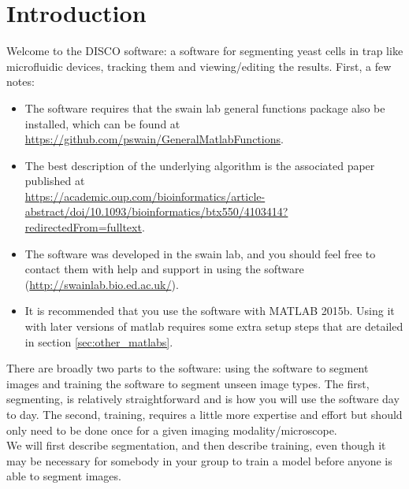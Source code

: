 \section{Introduction}
\label{sec:intro}
 
 Welcome to the DISCO software: a software for segmenting yeast cells in trap like microfluidic devices, tracking them and viewing/editing the results. First, a few notes:
 \begin{itemize}
 	\item The software requires that the swain lab general functions package also be installed, which can be found at \href{https://github.com/pswain/GeneralMatlabFunctions}{https://github.com/pswain/GeneralMatlabFunctions}.
 	\item The best description of the underlying algorithm is the associated paper published at\\ \href{https://academic.oup.com/bioinformatics/article-abstract/doi/10.1093/bioinformatics/btx550/4103414?redirectedFrom=fulltext}{https://academic.oup.com/bioinformatics/article-abstract/doi/10.1093/bioinformatics/btx550/4103414?redirectedFrom=fulltext}.
 	\item The software was developed in the swain lab, and you should feel free to contact them with help and support in using the software (\href{http://swainlab.bio.ed.ac.uk/}{http://swainlab.bio.ed.ac.uk/}).
 	\item It is recommended that you use the software with MATLAB 2015b. Using it with later versions of matlab requires some extra setup steps that are detailed in section \ref{sec:other_matlabs}.
 \end{itemize}
 
 There are broadly two parts to the software: using the software to segment images and training the software to segment unseen image types. The first, segmenting, is relatively straightforward and is how you will use the software day to day. The second, training, requires a little more expertise and effort but should only need to be done once for a given imaging modality/microscope. \\
 We will first describe segmentation, and then describe training, even though it may be necessary for somebody in your group to train a model before anyone is able to segment images.